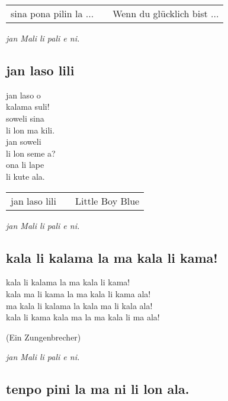 \begin{supertabular}{p{5,5cm}|ll}
sina pona pilin la ... && Wenn du glücklich bist ... \\
\end{supertabular}

\textit{jan Mali li pali e ni. \cite{www:astrodonunt:01}}

\subsection{jan laso lili}

jan laso o  \\
kalama suli!  \\
soweli sina  \\
li lon ma kili.  \\
jan soweli  \\
li lon seme a?  \\
ona li lape  \\
li kute ala.  \\

\begin{supertabular}{p{5,5cm}|ll}
jan laso lili && Little Boy Blue \\
\end{supertabular}

\textit{jan Mali li pali e ni. \cite{www:astrodonunt:01}}

\subsection{kala li kalama la ma kala li kama!}

kala li kalama la ma kala li kama!           \\
kala ma li kama la ma kala li kama ala!      \\
ma kala li kalama la kala ma li kala ala!    \\
kala li kama kala ma la ma kala li ma ala!

(Ein Zungenbrecher)

\textit{jan Mali li pali e ni. \cite{www:astrodonunt:01}}

\subsection{tenpo pini la ma ni li lon ala.}

